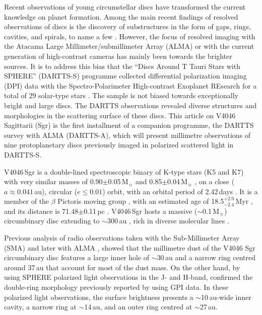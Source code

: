 \documentclass[fleqn,usenatbib,useAMS]{mnras}
\begin{document}
Recent observations of young circumstellar discs have transformed the current knowledge on planet formation. Among the main recent findings of resolved observations of discs is the discovery of substructures in the form of gaps, rings, cavities, and spirals, to name a few \citep[see,][and references there in]{Andrews_2020_aug}. However, the focus of resolved imaging with the Atacama Large Millimeter/submillimeter Array (ALMA) or with the current generation of high-contrast cameras has mainly been towards the brighter sources. It is to address this bias that the ``Discs Around T Tauri Stars with SPHERE'' (DARTTS-S) programme collected differential polarization imaging (DPI) data with the Spectro-Polarimeter High-contrast Exoplanet REsearch \citep[SPHERE][]{2019A&A...631A.155B} for a total of 29 solar-type stars \citep[][]{Avenhaus_2018,Garufi2020}. The sample is not biased towards exceptionally bright and large discs. The DARTTS observations revealed diverse structures and morphologies in the scattering surface of these discs. This article on V4046 Sagittarii (Sgr) is the first installment of a companion programme, the DARTTS survey with ALMA (DARTTS-A), which will present millimetre observations of nine protoplanetary discs previously imaged in polarized scattered light in DARTTS-S.

V4046\,Sgr is a double-lined spectroscopic binary of K-type stars (K5 and K7) with very similar masses of 0.90$\pm$0.05\,M$_{\sun}$ and 0.85$\pm$0.04\,M$_{\sun}$ \citep{Rosenfeld_2012}, on a close ($a \approx 0.041$\,au), circular ($e\leq0.01$) orbit, with an orbital period of 2.42\,days \citep{2000IAUS..200P..28Q}. It is a member of the $\beta$ Pictoris moving group \citep{Zuckerman_2004}, with an estimated age of 18.5$^{+2.0}_{-2.4}$\,Myr \citep{2020A&A...642A.179M}, and its distance is 71.48$\pm$0.11\,pc \citep{gaiacollaboration2020gaia}. V4046\,Sgr hosts a massive ($\sim$0.1\,M$_{\sun}$) circumbinary disc extending to $\sim$300\,au \citep{Rosenfeld_2013, Rodriguez_2010}, rich in diverse molecular lines \citep{Kastner_2018}.

Previous analysis of radio observations taken with the Sub-Millimeter Array (SMA) \citep{Rosenfeld_2013} and later with ALMA \citep{Guzman_2017,Huang_2017,Bergner_2018,Kastner_2018}, showed that the millimetre dust of the V4046 Sgr circumbinary disc features a large inner hole of $\sim$30\,au and a narrow ring centred around 37\,au that account for most of the dust mass. On the other hand, by using SPHERE polarized light observations in the J- and H-band, \citet{Avenhaus_2018} confirmed the double-ring morphology previously reported by \citet{Rapson_2015} using GPI data. In these polarized light observations, the surface brightness presents a $\sim$10\,au-wide inner cavity, a narrow ring at $\sim$14\,au, and an outer ring centred at $\sim$27\,au.
\end{document}
